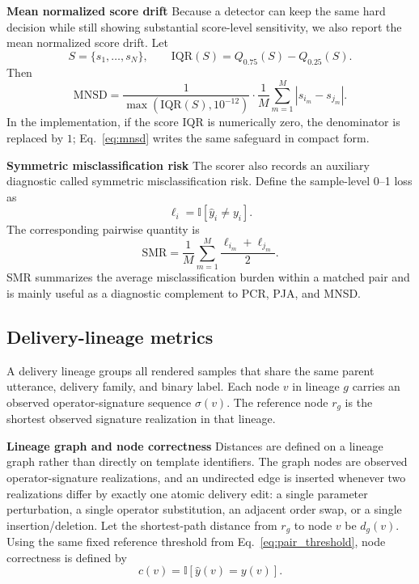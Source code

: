 \noindent\textbf{Mean normalized score drift} Because a detector can keep the same hard decision while still showing substantial score-level sensitivity, we also report the mean normalized score drift. Let
\begin{equation}
S = \{s_1,\ldots,s_N\},
\qquad
\mathrm{IQR}(S)=Q_{0.75}(S)-Q_{0.25}(S).
\label{eq:iqr_definition}
\end{equation}
Then
\begin{equation}
\mathrm{MNSD} =
\frac{1}{\max(\mathrm{IQR}(S), 10^{-12})}
\cdot
\frac{1}{M}
\sum_{m=1}^{M}
|s_{i_m}-s_{j_m}|.
\label{eq:mnsd}
\end{equation}
In the implementation, if the score IQR is numerically zero, the denominator is replaced by $1$; Eq.~\eqref{eq:mnsd} writes the same safeguard in compact form.

\noindent\textbf{Symmetric misclassification risk} The scorer also records an auxiliary diagnostic called symmetric misclassification risk. Define the sample-level 0--1 loss as
\begin{equation}
\ell_i = \mathbb{I}[\hat{y}_i \neq y_i].
\label{eq:zero_one_loss}
\end{equation}
The corresponding pairwise quantity is
\begin{equation}
\mathrm{SMR} =
\frac{1}{M}
\sum_{m=1}^{M}
\frac{\ell_{i_m}+\ell_{j_m}}{2}.
\label{eq:smr}
\end{equation}
SMR summarizes the average misclassification burden within a matched pair and is mainly useful as a diagnostic complement to PCR, PJA, and MNSD.

\subsection{Delivery-lineage metrics}

A delivery lineage groups all rendered samples that share the same parent utterance, delivery family, and binary label. Each node $v$ in lineage $g$ carries an observed operator-signature sequence $\sigma(v)$. The reference node $r_g$ is the shortest observed signature realization in that lineage.

\noindent\textbf{Lineage graph and node correctness} Distances are defined on a lineage graph rather than directly on template identifiers. The graph nodes are observed operator-signature realizations, and an undirected edge is inserted whenever two realizations differ by exactly one atomic delivery edit: a single parameter perturbation, a single operator substitution, an adjacent order swap, or a single insertion/deletion. Let the shortest-path distance from $r_g$ to node $v$ be $d_g(v)$.
Using the same fixed reference threshold from Eq.~\eqref{eq:pair_threshold}, node correctness is defined by
\begin{equation}
c(v) = \mathbb{I}[\hat{y}(v)=y(v)].
\label{eq:node_correctness}
\end{equation}

